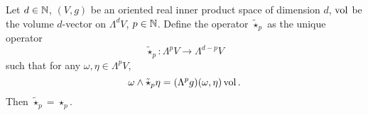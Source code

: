 \begin{proposition}
  Let
    $d \in \mathbb{N}$,
    $(V, g)$ be an oriented real inner product space of dimension $d$,
    $\mathop{\rm vol}\nolimits$ be the volume $d$-vector on $\Lambda^d V$,
    $p \in \mathbb{N}$.
  Define the operator $\tilde{\star}_p$ as the unique operator
  \begin{equation}
    \tilde{\star}_p \colon \Lambda^p V \to \Lambda^{d - p} V
  \end{equation}
  such that for any $\omega, \eta \in \Lambda^p V$,
  \begin{equation}
    \omega \wedge \tilde{\star}_p \eta = (\Lambda^p g)(\omega, \eta) \mathop{\rm vol}\nolimits.
  \end{equation}
  Then $\tilde{\star}_p = \star_p$.
\end{proposition}
